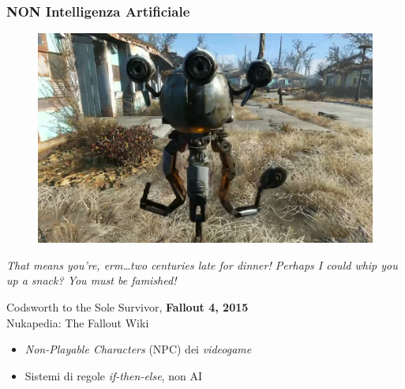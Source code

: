 %
\begin{frame}[t] \frametitle{NON Intelligenza Artificiale}
	\vspace*{-.5cm}
	\begin{center}
		\begin{minipage}[t]{0.6\textwidth}
			\centering
			\begin{figure}[ht]
				\includegraphics[width=\textwidth]{img/codsworth.png}
			\end{figure}
		\end{minipage}
		\begin{minipage}[t]{.6\textwidth}
			\renewcommand{\epigraphsize}{\tiny}
			\setlength{\afterepigraphskip}{0pt}
			\setlength{\beforeepigraphskip}{5pt}
			\setlength{\epigraphwidth}{\textwidth}
			\epigraph{\textit{That means you're, erm\ldots two centuries late for dinner! Perhaps I could whip you up a snack? You must be famished!}}{Codsworth to the Sole Survivor, \textbf{Fallout 4, 2015}\\\textcopyright Nukapedia: The Fallout Wiki}
		\end{minipage}
	\end{center}
	\begin{itemize}[leftmargin=10pt,align=right]
		\item[\alert{\faHandORight}] \alert{\textit{Non-Playable Characters}} (NPC) dei \textit{videogame} 
		\onslide<3->\item[\alert{\faHandORight}] Sistemi di regole \textit{if-then-else}, \alert{non} AI
	\end{itemize}
\end{frame}